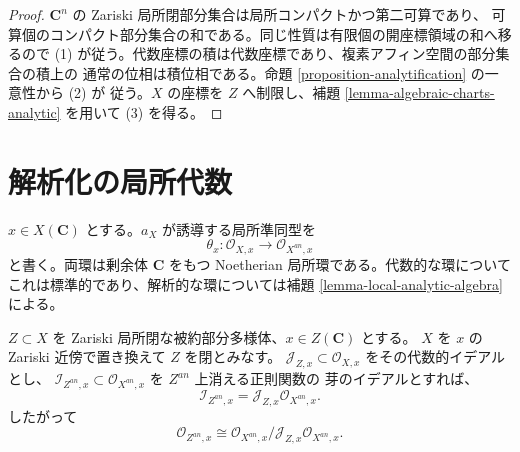 \begin{proof}
$\mathbf C^n$ の Zariski 局所閉部分集合は局所コンパクトかつ第二可算であり、
可算個のコンパクト部分集合の和である。同じ性質は有限個の開座標領域の和へ移るので
(1) が従う。代数座標の積は代数座標であり、複素アフィン空間の部分集合の積上の
通常の位相は積位相である。命題 \ref{proposition-analytification} の一意性から (2) が
従う。$X$ の座標を $Z$ へ制限し、補題 \ref{lemma-algebraic-charts-analytic} を用いて
(3) を得る。
\end{proof}

\section{解析化の局所代数}
\label{section-local-comparison}

\noindent
$x \in X(\mathbf C)$ とする。$a_X$ が誘導する局所準同型を
$$
\theta_x : \mathcal O_{X,x} \longrightarrow \mathcal O_{X^{an},x}
$$
と書く。両環は剰余体 $\mathbf C$ をもつ Noetherian 局所環である。代数的な環について
これは標準的であり、解析的な環については補題 \ref{lemma-local-analytic-algebra} による。

\begin{proposition}
\label{proposition-analytification-closed-ideal}
$Z \subset X$ を Zariski 局所閉な被約部分多様体、$x \in Z(\mathbf C)$ とする。
$X$ を $x$ の Zariski 近傍で置き換えて $Z$ を閉とみなす。
$\mathcal J_{Z,x} \subset \mathcal O_{X,x}$ をその代数的イデアルとし、
$\mathcal I_{Z^{an},x} \subset \mathcal O_{X^{an},x}$ を $Z^{an}$ 上消える正則関数の
芽のイデアルとすれば、
$$
\mathcal I_{Z^{an},x} =
\mathcal J_{Z,x}\mathcal O_{X^{an},x}.
$$
したがって
$$
\mathcal O_{Z^{an},x} \cong
\mathcal O_{X^{an},x}/
\mathcal J_{Z,x}\mathcal O_{X^{an},x}.
$$
\end{proposition}

